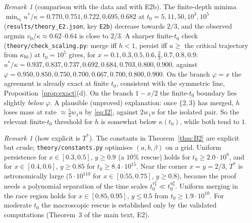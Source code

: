 \documentclass[11pt]{article}
\theoremstyle{definition}
\theoremstyle{remark}
\newtheorem{remark}[theorem]{Remark}
\begin{document}
\begin{remark}[comparison with the data and with E2b]
The finite-depth minima $\min_{v_0}u^*/\kappa=0.770,0.751,0.722,0.695,0.682$ at $t_0=5,11,50,10^3,10^5$
(\texttt{results/theory\_E2.json}, key \texttt{E2b}) decrease towards $2/3$, and the observed argmin
$v_0/\kappa\approx0.62$--$0.64$ is close to $2/3$. A sharper finite-$t_0$ check
(\texttt{theory/check\_scaling.py}: merge iff $h<1$, persist iff $u\ge$ the critical trajectory from
$\kappa_{\rm hi}$) at $t_0=10^5$ gives, for $x=0.1,0.3,0.5,0.6,\frac23,0.7,0.8,0.9$:
$u^*/\kappa=0.937,0.837,0.737,0.692,0.684,0.703,0.800,0.900$, against
$\varphi=0.950,0.850,0.750,0.700,0.667,0.700,0.800,0.900$. On the branch $\varphi=x$ the agreement is already
exact at finite $t_0$, consistent with the symmetric line, Proposition~\ref{prop:exact}(d). On the branch
$1-x/2$ the finite-$t_0$ boundary lies slightly \emph{below} $\varphi$. A plausible (unproved) explanation:
once $\{2,3\}$ has merged, $h$ loses mass at rate $\approx\frac54w_1u$ by \eqref{eq:I2}, against $2w_1u$ for the
isolated pair. So the relevant finite-$t_0$ threshold for $h$ is somewhat below $\kappa(t_0)$, while both tend to $1$.
\end{remark}

\begin{remark}[how explicit is $T^*$]
The constants in Theorem~\ref{thm:B2} are explicit but crude; \texttt{theory/constants.py} optimises
$(a,b,\beta)$ on a grid. Uniform persistence for $x\in[0.3,0.5]$, $y\ge0.9$ (a $10\%$ rescue) holds for
$t_0\ge2.0\cdot10^8$, and for $x\in[0.4,0.6]$, $y\ge0.85$ for $t_0\ge8.4\cdot10^{15}$. Near the corner $x=y=2/3$,
$T^*$ is astronomically large ($5\cdot10^{110}$ for $x\in[0.55,0.75]$, $y\ge0.8$), because the proof needs a
polynomial separation of the time scales $t_0^{v_0^2}\ll t_0^{u_0^2}$. Uniform merging in the race region
holds for $x\in[0.85,0.95]$, $y\le0.5$ from $t_0\ge1.9\cdot10^{10}$. For moderate $t_0$ the macroscopic
rescue is established only by the validated computations (Theorem~3 of the main text, E2).
\end{remark}

\end{document}
